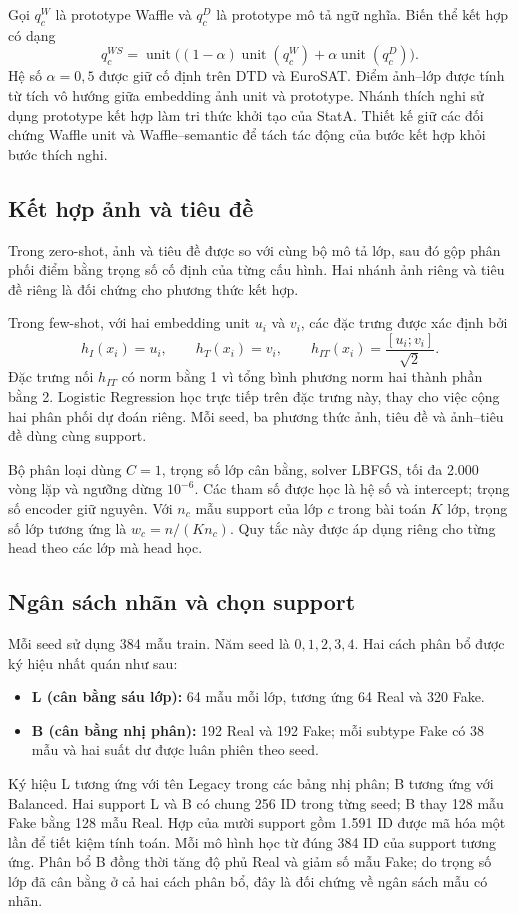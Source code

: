 \documentclass[12pt,a4paper]{article}
\numberwithin{figure}{section}
\numberwithin{table}{section}
\numberwithin{equation}{section}
\newcommand{\unit}{\operatorname{unit}}
\begin{document}
Gọi $q_c^W$ là prototype Waffle và $q_c^D$ là prototype mô tả ngữ nghĩa. Biến thể kết hợp có dạng
\begin{equation}
q_c^{WS}=\unit\big((1-\alpha)\unit(q_c^W)+\alpha\unit(q_c^D)\big).
\end{equation}
Hệ số $\alpha=0{,}5$ được giữ cố định trên DTD và EuroSAT. Điểm ảnh--lớp được tính từ tích vô hướng giữa embedding ảnh unit và prototype. Nhánh thích nghi sử dụng prototype kết hợp làm tri thức khởi tạo của StatA. Thiết kế giữ các đối chứng Waffle unit và Waffle--semantic để tách tác động của bước kết hợp khỏi bước thích nghi.

\subsection{Kết hợp ảnh và tiêu đề}
Trong zero-shot, ảnh và tiêu đề được so với cùng bộ mô tả lớp, sau đó gộp phân phối điểm bằng trọng số cố định của từng cấu hình. Hai nhánh ảnh riêng và tiêu đề riêng là đối chứng cho phương thức kết hợp.

Trong few-shot, với hai embedding unit $u_i$ và $v_i$, các đặc trưng được xác định bởi
\begin{equation}
h_I(x_i)=u_i,\qquad h_T(x_i)=v_i,\qquad
h_{IT}(x_i)=\frac{[u_i;v_i]}{\sqrt{2}}.
\end{equation}
Đặc trưng nối $h_{IT}$ có norm bằng 1 vì tổng bình phương norm hai thành phần bằng 2. Logistic Regression học trực tiếp trên đặc trưng này, thay cho việc cộng hai phân phối dự đoán riêng. Mỗi seed, ba phương thức ảnh, tiêu đề và ảnh--tiêu đề dùng cùng support.

Bộ phân loại dùng $C=1$, trọng số lớp cân bằng, solver LBFGS, tối đa 2.000 vòng lặp và ngưỡng dừng $10^{-6}$. Các tham số được học là hệ số và intercept; trọng số encoder giữ nguyên. Với $n_c$ mẫu support của lớp $c$ trong bài toán $K$ lớp, trọng số lớp tương ứng là $w_c=n/(Kn_c)$. Quy tắc này được áp dụng riêng cho từng head theo các lớp mà head học.

\subsection{Ngân sách nhãn và chọn support}
Mỗi seed sử dụng 384 mẫu train. Năm seed là $0,1,2,3,4$. Hai cách phân bổ được ký hiệu nhất quán như sau:
\begin{itemize}
\item \textbf{L (cân bằng sáu lớp):} 64 mẫu mỗi lớp, tương ứng 64 Real và 320 Fake.
\item \textbf{B (cân bằng nhị phân):} 192 Real và 192 Fake; mỗi subtype Fake có 38 mẫu và hai suất dư được luân phiên theo seed.
\end{itemize}
Ký hiệu L tương ứng với tên Legacy trong các bảng nhị phân; B tương ứng với Balanced.
Hai support L và B có chung 256 ID trong từng seed; B thay 128 mẫu Fake bằng 128 mẫu Real. Hợp của mười support gồm 1.591 ID được mã hóa một lần để tiết kiệm tính toán. Mỗi mô hình học từ đúng 384 ID của support tương ứng. Phân bổ B đồng thời tăng độ phủ Real và giảm số mẫu Fake; do trọng số lớp đã cân bằng ở cả hai cách phân bổ, đây là đối chứng về ngân sách mẫu có nhãn.
\end{document}
